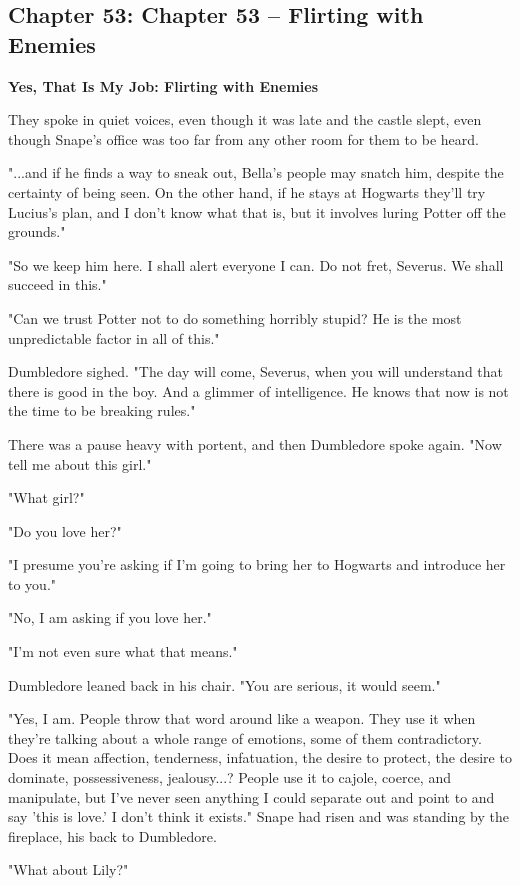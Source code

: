 \documentclass[a4paper,11pt]{article}
\begin{document}
\subsection{Chapter 53: Chapter 53 – Flirting with Enemies}

\textbf{Yes, That Is My Job: Flirting with Enemies}

They spoke in quiet voices, even though it was late and the castle slept, even though Snape's office was too far from any other room for them to be heard.

"...and if he finds a way to sneak out, Bella's people may snatch him, despite the certainty of being seen. On the other hand, if he stays at Hogwarts they'll try Lucius's plan, and I don't know what that is, but it involves luring Potter off the grounds."

"So we keep him here. I shall alert everyone I can. Do not fret, Severus. We shall succeed in this."

"Can we trust Potter not to do something horribly stupid? He is the most unpredictable factor in all of this."

Dumbledore sighed. "The day will come, Severus, when you will understand that there is good in the boy. And a glimmer of intelligence. He knows that now is not the time to be breaking rules."

There was a pause heavy with portent, and then Dumbledore spoke again. "Now tell me about this girl."

"What girl?"

"Do you love her?"

"I presume you're asking if I'm going to bring her to Hogwarts and introduce her to you."

"No, I am asking if you love her."

"I'm not even sure what that means."

Dumbledore leaned back in his chair. "You are serious, it would seem."

"Yes, I am. People throw that word around like a weapon. They use it when they're talking about a whole range of emotions, some of them contradictory. Does it mean affection, tenderness, infatuation, the desire to protect, the desire to dominate, possessiveness, jealousy...? People use it to cajole, coerce, and manipulate, but I've never seen anything I could separate out and point to and say 'this is love.' I don't think it exists." Snape had risen and was standing by the fireplace, his back to Dumbledore.

"What about Lily?"
\end{document}
